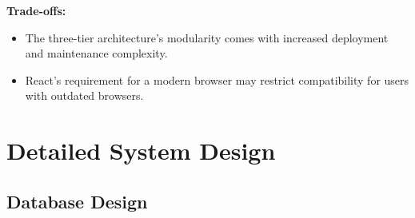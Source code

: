 \documentclass[a4paper, 12pt]{article}
\begin{document}
\textbf{Trade-offs:}
\begin{itemize}
    \item The three-tier architecture’s modularity comes with increased deployment and maintenance complexity.
    \item React’s requirement for a modern browser may restrict compatibility for users with outdated browsers.
\end{itemize}

\newpage
\section{Detailed System Design}
\subsection{Database Design}
\end{document}
